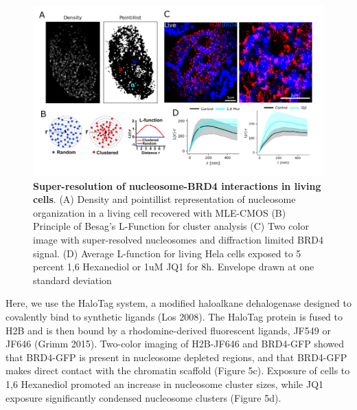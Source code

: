 \documentclass{ucetd}
\begin{document}
\begin{figure}
\begin{center}
\includegraphics[width=17cm]{BRD4-Results.png}
\end{center}
\caption{\textbf{Super-resolution of nucleosome-BRD4 interactions in living cells}. (A) Density and pointillist representation of nucleosome organization in a living cell recovered with MLE-CMOS (B) Principle of Besag's L-Function for cluster analysis (C) Two color image with super-resolved nucleosomes and diffraction limited BRD4 signal. (D) Average L-function for living Hela cells exposed to 5 percent 1,6 Hexanediol or 1uM JQ1 for 8h. Envelope drawn at one standard deviation}
\end{figure}

Here, we use the HaloTag system, a modified haloalkane dehalogenase designed to covalently bind to synthetic ligands  (Los 2008). The HaloTag protein is fused to H2B and is then bound by a rhodomine-derived fluorescent ligands, JF549 or JF646 (Grimm 2015). Two-color imaging of H2B-JF646 and BRD4-GFP showed that BRD4-GFP is present in nucleosome depleted regions, and that BRD4-GFP makes direct contact with the chromatin scaffold (Figure 5c). Exposure of cells to 1,6 Hexanediol promoted an increase in nucleosome cluster sizes, while JQ1 exposure significantly condensed nucleosome clusters (Figure 5d). 
\end{document}
